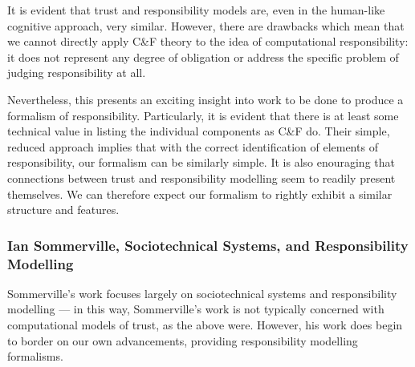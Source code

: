It is evident that trust and responsibility models are, even in the human-like cognitive approach, very similar. However, there are drawbacks which mean that we cannot directly apply C\&F theory to the idea of computational responsibility: it does not represent any degree of obligation or address the specific problem of judging responsibility at all.\par

Nevertheless, this presents an exciting insight into work to be done to produce a formalism of responsibility. Particularly, it is evident that there is at least some technical value in listing the individual components as C\&F do. Their simple, reduced approach implies that with the correct identification of elements of responsibility, our formalism can be similarly simple. It is also enouraging that connections between trust and responsibility modelling seem to readily present themselves. We can therefore expect our formalism to rightly exhibit a similar structure and features.\par



\subsubsection{Ian Sommerville, Sociotechnical Systems, and Responsibility Modelling}
Sommerville's work focuses largely on sociotechnical systems and responsibility modelling --- in this way, Sommerville's work is not typically concerned with computational models of trust, as the above were. However, his work does begin to border on our own advancements, providing responsibility modelling formalisms.\par

